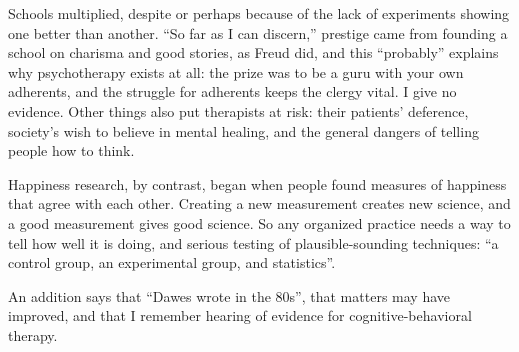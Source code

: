 Schools multiplied, despite or perhaps because of the lack of experiments showing one better than another. ``So far as I can discern,'' prestige came from founding a school on charisma and good stories, as Freud did, and this ``probably'' explains why psychotherapy exists at all: the prize was to be a guru with your own adherents, and the struggle for adherents keeps the clergy vital. I give no evidence. Other things also put therapists at risk: their patients' deference, society's wish to believe in mental healing, and the general dangers of telling people how to think.

Happiness research, by contrast, began when people found measures of happiness that agree with each other. Creating a new measurement creates new science, and a good measurement gives good science.  So any organized practice needs a way to tell how well it is doing, and serious testing of plausible-sounding techniques: ``a control group, an experimental group, and statistics''. 

An addition says that ``Dawes wrote in the 80s'', that matters may have improved, and that I remember hearing of evidence for cognitive-behavioral therapy. 
